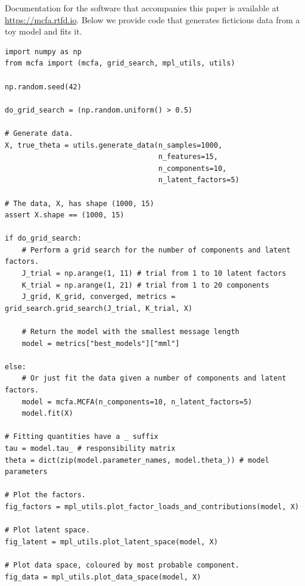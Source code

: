 \documentclass[twocolumn]{aastex62}
\begin{document}




\appendix

Documentation for the software that accompanies this paper is available at \url{https://mcfa.rtfd.io}. 
Below we provide code that generates ficticious data from a toy model and fits it.\\

\begin{verbatim}
import numpy as np
from mcfa import (mcfa, grid_search, mpl_utils, utils)

np.random.seed(42)

do_grid_search = (np.random.uniform() > 0.5)

# Generate data.
X, true_theta = utils.generate_data(n_samples=1000,
                                    n_features=15,
                                    n_components=10,
                                    n_latent_factors=5)

# The data, X, has shape (1000, 15)
assert X.shape == (1000, 15)

if do_grid_search:
    # Perform a grid search for the number of components and latent factors.
    J_trial = np.arange(1, 11) # trial from 1 to 10 latent factors 
    K_trial = np.arange(1, 21) # trial from 1 to 20 components
    J_grid, K_grid, converged, metrics = grid_search.grid_search(J_trial, K_trial, X)

    # Return the model with the smallest message length
    model = metrics["best_models"]["mml"]

else:
    # Or just fit the data given a number of components and latent factors.
    model = mcfa.MCFA(n_components=10, n_latent_factors=5)
    model.fit(X)

# Fitting quantities have a _ suffix
tau = model.tau_ # responsibility matrix
theta = dict(zip(model.parameter_names, model.theta_)) # model parameters

# Plot the factors.
fig_factors = mpl_utils.plot_factor_loads_and_contributions(model, X)

# Plot latent space.
fig_latent = mpl_utils.plot_latent_space(model, X)

# Plot data space, coloured by most probable component.
fig_data = mpl_utils.plot_data_space(model, X)
\end{verbatim}
\end{document}
